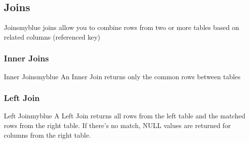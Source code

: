 \subsection{Joins}
\begin{prettyBox}{Joins}{myblue}
joins allow you to combine rows from two or more tables based on related columns (referenced key)
\end{prettyBox}

\subsubsection{Inner Joins}
\begin{prettyBox}{Inner Joins}{myblue}
An Inner Join returns only the common rows between tables
\begin{center}
\end{center}
\end{prettyBox}
\subsubsection{Left Join}

\begin{prettyBox}{Left Join}{myblue}
A Left Join returns all rows from the left table and the matched rows from the right table. If there’s no match,
NULL values are returned for columns from the right table.

\begin{center}
\end{center}
\end{prettyBox}

